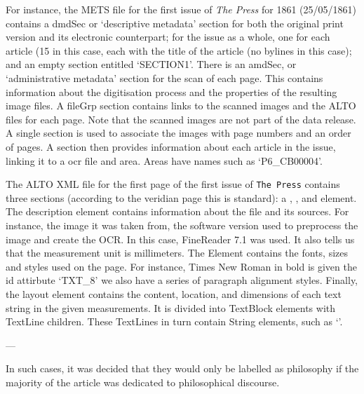 For instance, the METS file for the first issue of \textit{The Press} for 1861 (25/05/1861) contains a dmdSec or ‘descriptive metadata’ section for both the original print version and its electronic counterpart; for the issue as a whole, one for each article (15 in this case, each with the title of the article (no bylines in this case); and an empty section entitled ‘SECTION1’. There is an amdSec, or ‘administrative metadata’ section for the scan of each page. This contains information about the digitisation process and the properties of the resulting image files. A fileGrp section contains links to the scanned images and the ALTO files for each page. Note that the scanned images are not part of the data release. A single  section is used to associate the images with page numbers and an order of pages.  A  section then provides information about each article in the issue, linking it to a ocr file and area. Areas have names such as ‘P6\_CB00004’.

The ALTO XML file for the first page of the first issue of \texttt{The Press} contains three sections (according to the veridian page this is standard): a , , and  element. The description element contains information about the file and its sources. For instance, the image it was taken from, the software version used to preprocess the image and create the OCR. In this case, FineReader 7.1 was used. It also tells us that the measurement unit is millimeters. The  Element contains the fonts, sizes and styles used on the page. For instance, Times New Roman in bold is given the id attirbute ‘TXT\_8’ we also have a series of paragraph alignment styles. Finally, the layout element contains the content, location, and dimensions of each text string in the given measurements. It is divided into TextBlock elements with TextLine children. These TextLines in turn contain String elements, such as ‘’.

---

In such cases, it was decided that they would only be labelled as philosophy if the majority of the article was dedicated to philosophical discourse.
